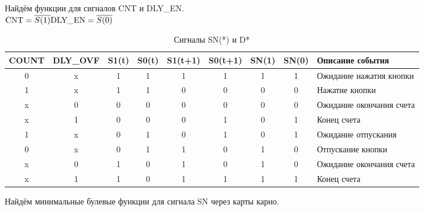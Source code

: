 \documentclass{bmstu}
\begin{document}
Найдём функции для сигналов CNT и DLY\_EN. \\

$	\text{CNT} = \overline{S(1)}\\
	\text{DLY\_EN} = \overline{S(0)}
$


\begin{table}[ht]
	\begin{center}
	\caption{Сигналы SN(*) и D*}
	\begin{tabular}{|c|c|c|c|c|c|c|c|l|}
		\hline
		   \scriptsize{COUNT} & 
		   \scriptsize{DLY\_OVF} & S1(t) & S0(t) & S1(t+1) & S0(t+1) & SN(1) & SN(0) & \scriptsize{Описание события} \\
		\hline
		0     & x        & 1     & 1     & 1       & 1       & 1     & 1     &  \scriptsize{Ожидание нажатия кнопки}\\
		\hline
		1     & x        & 1     & 1     & 0       & 0       & 0     & 0     &  \scriptsize{Нажатие кнопки}\\
		\hline
		x     & 0        & 0     & 0     & 0       & 0       & 0     & 0     &  \scriptsize{Ожидание окончания счета}\\
		\hline
		x     & 1        & 0     & 0     & 0       & 1       & 0     & 1     &  \scriptsize{Конец счета}\\
		\hline
		1     & x        & 0     & 1     & 0       & 1       & 0     & 1     &  \scriptsize{Ожидание отпускания}\\
		\hline
		0     & x        & 0     & 1     & 1       & 0       & 1     & 0     &  \scriptsize{Отпускание кнопки}\\
		\hline
		x     & 0        & 1     & 0     & 1       & 0       & 1     & 0     &  \scriptsize{Ожидание окончания счета}\\
		\hline
		x     & 1        & 1     & 0     & 1       & 1       & 1     & 1     &  \scriptsize{Конец счета}\\
		\hline
	\end{tabular}
	\end{center}
\end{table}

Найдём минимальные булевые функции для сигнала SN через карты карно.
\end{document}
